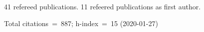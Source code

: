 41 refereed publications. 11 refeered publications as first author.

Total citations~=~887; h-index~=~15 (2020-01-27)
